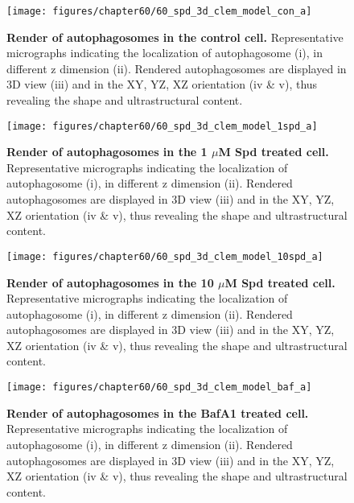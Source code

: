 \begin{figure}[!htbp]
\center
  \texttt{[image: figures/chapter60/60\_spd\_3d\_clem\_model\_con\_a]}
  \caption[Render of autophagosomes in the control cell]{\textbf{Render of autophagosomes in the control cell.} Representative micrographs indicating the localization of autophagosome (i), in different z dimension (ii). Rendered autophagosomes are displayed in 3D view (iii) and in the XY, YZ, XZ orientation  (iv \& v), thus revealing the shape and ultrastructural content.}
  \label{fig:60_spd_3d_clem_model_con_a}
\end{figure} 

\begin{figure}[!htbp]
\center
  \texttt{[image: figures/chapter60/60\_spd\_3d\_clem\_model\_1spd\_a]}
  \caption[Render of autophagosomes in the 1 $\mu$M Spd treated cell]{\textbf{Render of autophagosomes in the 1 $\mu$M Spd treated cell.} Representative micrographs indicating the localization of autophagosome (i), in different z dimension (ii). Rendered autophagosomes are displayed in 3D view (iii) and in the XY, YZ, XZ orientation  (iv \& v), thus revealing the shape and ultrastructural content.}
  \label{fig:60_spd_3d_clem_model_1spd_a}
\end{figure} 

\begin{figure}[!htbp]
\center
  \texttt{[image: figures/chapter60/60\_spd\_3d\_clem\_model\_10spd\_a]}
  \caption[Render of autophagosomes in the 10 $\mu$M Spd treated cell]{\textbf{Render of autophagosomes in the 10 $\mu$M Spd treated cell.} Representative micrographs indicating the localization of autophagosome (i), in different z dimension (ii). Rendered autophagosomes are displayed in 3D view (iii) and in the XY, YZ, XZ orientation  (iv \& v), thus revealing the shape and ultrastructural content.}
  \label{fig:60_spd_3d_clem_model_10spd_a}
\end{figure} 

\begin{figure}[!htbp]
\center
  \texttt{[image: figures/chapter60/60\_spd\_3d\_clem\_model\_baf\_a]}
  \caption[Render of autophagosomes in the BafA1 treated cell]{\textbf{Render of autophagosomes in the BafA1 treated cell.} Representative micrographs indicating the localization of autophagosome (i), in different z dimension (ii). Rendered autophagosomes are displayed in 3D view (iii) and in the XY, YZ, XZ orientation  (iv \& v), thus revealing the shape and ultrastructural content.}
  \label{fig:60_spd_3d_clem_model_baf_a}
\end{figure} 

